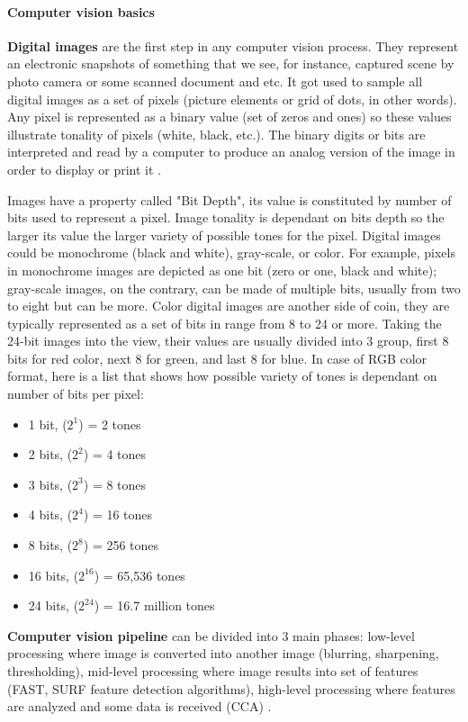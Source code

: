 \documentclass[../../../../main]{subfiles}
\begin{document}
\paragraph{Computer vision basics}

\textbf{Digital images} are the first step in any computer vision process. They represent an electronic snapshots of something that we see, for instance, captured scene by photo camera or some scanned document and etc. It got used to sample all digital images as a set of pixels (picture elements or grid of dots, in other words). Any pixel is represented as a binary value (set of zeros and ones) so these values illustrate tonality of pixels (white, black, etc.). The binary digits or bits are interpreted and read by a computer to produce an analog version of the image in order to display or print it \cite{digital_images}.

Images have a property called "Bit Depth", its value is constituted by number of bits used to represent a pixel. Image tonality is dependant on bits depth so the larger its value the larger variety of possible tones for the pixel. Digital images could be monochrome (black and white), gray-scale, or color. For example, pixels in monochrome images are depicted as one bit (zero or one, black and white); gray-scale images, on the contrary, can be made of multiple bits, usually from two to eight but can be more. Color digital images are another side of coin, they are typically represented as a set of bits in range from 8 to 24 or more. Taking the 24-bit images into the view, their values are usually divided into 3 group, first 8 bits for red color, next 8 for green, and last 8 for blue.
In case of \ac{RGB} color format, here is a list that shows how possible variety of tones is dependant on number of bits per pixel:

\begin{itemize}
    \item 1 bit, ($2^1$) = 2 tones
    \item 2 bits, ($2^2$) = 4 tones
    \item 3 bits, ($2^3$) = 8 tones
    \item 4 bits, ($2^4$) = 16 tones
    \item 8 bits, ($2^8$) = 256 tones
    \item 16 bits, ($2^{16}$) = 65,536 tones
    \item 24 bits, ($2^{24}$) = 16.7 million tones
\end{itemize}

\textbf{Computer vision pipeline} can be divided into 3 main phases: low-level processing where image is converted into another image (blurring, sharpening, thresholding), mid-level processing where image results into set of features (\ac{FAST}, \ac{SURF} feature detection algorithms), high-level processing where features are analyzed and some data is received (\ac{CCA}) \cite{cv_basics_linda_shapiro}. 
\end{document}
